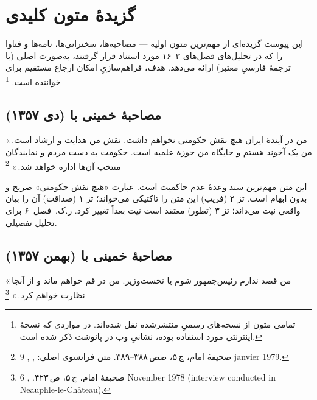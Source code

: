 \chapter{گزیدهٔ متون کلیدی}
\label{app:texts}

\begin{infoBox}
این پیوست گزیده‌ای از مهم‌ترین متون اولیه
— مصاحبه‌ها، سخنرانی‌ها، نامه‌ها و فتاوا —
را که در تحلیل‌های فصل‌های ۳–۱۶ مورد استناد قرار گرفتند،
به‌صورت اصلی (یا ترجمهٔ فارسیِ معتبر) ارائه می‌دهد.
هدف، فراهم‌سازیِ امکان ارجاع مستقیم
برای خواننده است.%
\footnote{تمامی متون از نسخه‌های رسمیِ منتشرشده نقل شده‌اند.
در مواردی که نسخهٔ اینترنتی مورد استفاده بوده، نشانیِ وب
در پانوشت ذکر شده است.}
\end{infoBox}

\section{مصاحبهٔ خمینی با  (دی ۱۳۵۷)}
\label{sec:app-b-lemonde}

\begin{warningBox}
«\,من در آیندهٔ ایران هیچ نقش حکومتی نخواهم داشت.
نقش من هدایت و ارشاد است.
من یک آخوند هستم و جایگاه من حوزهٔ علمیه است.
حکومت به دست مردم و نمایندگان منتخب آن‌ها اداره خواهد شد.\,»%
\footnote{صحیفهٔ امام، ج\,۵، صص\,۳۸۸–۳۸۹.
متن فرانسوی اصلی:
,
\textit{}, 9 janvier 1979.}
\end{warningBox}

\begin{noteBox}
این متن مهم‌ترین سند وعدهٔ عدم حاکمیت است.
عبارت «هیچ نقش حکومتی» صریح و بدون ابهام است.
تز ۲ (فریب) این متن را تاکتیکی می‌خواند؛
تز ۱ (صداقت) آن را بیان واقعی نیت می‌داند؛
تز ۳ (تطور) معتقد است نیت بعداً تغییر کرد.
ر.ک.\ فصل~۶ برای تحلیل تفصیلی.
\end{noteBox}

\section{مصاحبهٔ خمینی با  (بهمن ۱۳۵۷)}
\label{sec:app-b-guardian}

\begin{warningBox}
«\,من قصد ندارم رئیس‌جمهور شوم یا نخست‌وزیر.
من در قم خواهم ماند و از آنجا نظارت خواهم کرد.\,»%
\footnote{صحیفهٔ امام، ج\,۵، ص\,۴۲۳.
, 6 November 1978 (interview conducted
in Neauphle-le-Château).}
\end{warningBox}

